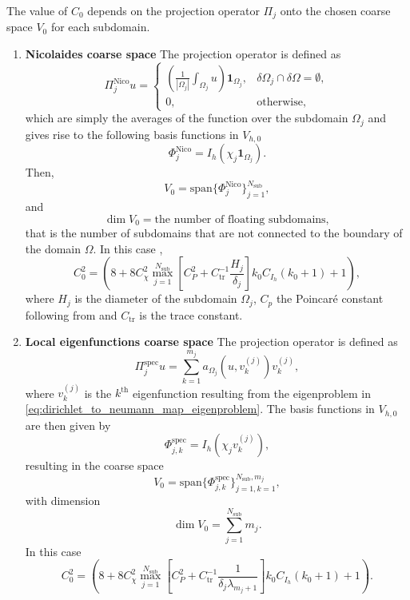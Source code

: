 The value of $C_0$ depends on the projection operator $\Pi_j$ onto the chosen coarse space $V_0$ for each subdomain.
\begin{enumerate}[label=\Roman*., ref=\textbf{ASM type \Roman* coarse space}]
  \item\label{ASM_coarse_space:nicolaides} \textbf{Nicolaides coarse space} The projection operator is defined as
  \begin{equation}
    \Pi_j^{\text{Nico}}u = \begin{cases}
      (\frac{1}{|\Omega_j|}\int_{\Omega_j} u)\mathbf{1}_{\Omega_j}, & \delta\Omega_j \cap \delta \Omega = \emptyset, \\
      0,                                                            & \text{otherwise},
    \end{cases}
    \label{eq:nicolaides_coarse_space_projection}
  \end{equation}
  which are simply the averages of the function over the subdomain $\Omega_j$ and gives rise to the following basis functions in $V_{h,0}$
  \[
    \Phi^{\text{Nico}}_j = I_h(\chi_j \mathbf{1}_{\Omega_j}).
  \]
  Then,
  \[
    V_0 = \text{span}\{\Phi^{\text{Nico}}_j\}_{j=1}^{N_{\text{sub}}},
  \]
  and
  \[
    \dim V_0 = \text{the number of floating subdomains},
  \]
  that is the number of subdomains that are not connected to the boundary of the domain $\Omega$. In this case \cite[Theorem 5.16]{schwarz_methods_Dolean_2015},
  \begin{equation}
    C_0^{2} = \left(8 + 8 C_{\chi}^2 \max_{j=1}^{N_{\text{sub}}}\left[C_P^2 + C^{-1}_{\text{tr}}\frac{H_j}{\delta_j}\right]k_0 C_{I_h}(k_0 + 1) + 1\right),
    \label{eq:c0_nicolaides}
  \end{equation}
  where $H_j$ is the diameter of the subdomain $\Omega_j$, $C_p$ the Poincaré constant following from \cite[Lemma 5.18]{schwarz_methods_Dolean_2015} and $C_{\text{tr}}$ is the trace constant.
  \item\label{ASM_coarse_space:local_eigenfunctions} \textbf{Local eigenfunctions coarse space} The projection operator is defined as
  \[
    \Pi_j^{\text{spec}}u = \sum_{k=1}^{m_j} a_{\Omega_j}(u, v^{(j)}_k) v^{(j)}_k,
  \]
  where $v^{(j)}_k$ is the $k^{\text{th}}$ eigenfunction resulting from the eigenproblem in \cref{eq:dirichlet_to_neumann_map_eigenproblem}. The basis functions in $V_{h,0}$ are then given by
  \[
    \Phi^{\text{spec}}_{j,k} = I_h(\chi_j v^{(j)}_k),
  \]
  resulting in the coarse space
  \[
    V_0 = \text{span}\{\Phi^{\text{spec}}_{j,k}\}_{j=1,k=1}^{N_{\text{sub}},m_j},
  \]
  with dimension
  \[
    \dim V_0 = \sum_{j=1}^{N_{\text{sub}}} m_j.
  \]
  In this case \cite[Theorem 5.17]{schwarz_methods_Dolean_2015}
  \begin{equation}
    C_0^{2} = \left(8 + 8 C_{\chi}^2 \max_{j=1}^{N_{\text{sub}}}\left[C_P^2 + C^{-1}_{\text{tr}}\frac{1}{\delta_j\lambda_{m_j +1}}\right]k_0 C_{I_h}(k_0 + 1) + 1\right).
    \label{eq:c0_local_eigenfunctions}
  \end{equation}
\end{enumerate}
